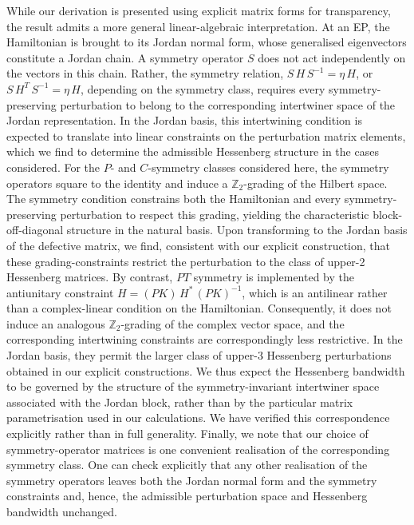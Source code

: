 \documentclass[aps, prb, onecolumn, nofootinbib, citeautoscript, 10pt]{revtex4-2}
\begin{document}
While our derivation is presented using explicit matrix forms for transparency, the result admits a more general linear-algebraic interpretation. At an EP, the Hamiltonian is brought to its Jordan normal form, whose generalised eigenvectors constitute a Jordan chain. A symmetry operator $S$ does not act independently on the vectors in this chain. Rather, the symmetry relation, $S \,H\, S^{-1}=\eta \,H$, or $S\, H^{T}\, S^{-1}=\eta \,H$, depending on the symmetry class, requires every symmetry-preserving perturbation to belong to the corresponding intertwiner space of the Jordan representation. In the Jordan basis, this intertwining condition is expected to translate into linear constraints on the perturbation matrix elements, which we find to determine the admissible Hessenberg structure in the cases considered. For the $P$- and $C$-symmetry classes considered here, the symmetry operators square to the identity and induce a $\mathbb{Z}_2$-grading of the Hilbert space. The symmetry condition constrains both the Hamiltonian and every symmetry-preserving perturbation to respect this grading, yielding the characteristic block-off-diagonal structure in the natural basis. Upon transforming to the Jordan basis of the defective matrix, we find, consistent with our explicit construction, that these grading-constraints restrict the perturbation to the class of upper-2 Hessenberg matrices.
By contrast, $PT$ symmetry is implemented by the antiunitary constraint $H=(PK)\,H^{*}\,(PK)^{-1}$, which is an antilinear rather than a complex-linear condition on the Hamiltonian. Consequently, it does not induce an analogous $\mathbb{Z}_2$-grading of the complex vector space, and the corresponding intertwining constraints are correspondingly less restrictive. In the Jordan basis, they permit the larger class of upper-3 Hessenberg perturbations obtained in our explicit constructions. We thus expect the Hessenberg bandwidth to be governed by the structure of the symmetry-invariant intertwiner space associated with the Jordan block, rather than by the particular matrix parametrisation used in our calculations. We have verified this correspondence explicitly rather than in full generality.
Finally, we note that our choice of symmetry-operator matrices is one convenient realisation of the corresponding symmetry class. One can check explicitly that any other realisation of the symmetry operators leaves both the Jordan normal form and the symmetry constraints and, hence, the admissible perturbation space and Hessenberg bandwidth unchanged.
\end{document}

